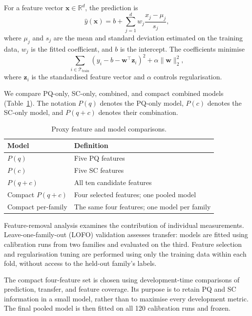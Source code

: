 \documentclass[a4paper,fleqn]{cas-dc}
\begin{document}
{For a feature vector $\mathbf{x}\in\mathbb{R}^{d}$, the prediction is
\begin{equation}
\hat{y}(\mathbf{x})
=
b+\sum_{j=1}^{d}
w_j\frac{x_j-\mu_j}{s_j},
\label{eq:ridge-proxy}
\end{equation}
where $\mu_j$ and $s_j$ are the mean and standard deviation estimated on the training data, $w_j$ is the fitted coefficient, and $b$ is the intercept. The coefficients minimise
\begin{equation}
\sum_{i\in\mathcal{T}_{\mathrm{train}}}
\left(y_i-b-\mathbf{w}^{\top}\mathbf{z}_i\right)^2
+\alpha\|\mathbf{w}\|_2^2,
\label{eq:ridge-objective}
\end{equation}
where $\mathbf{z}_i$ is the standardised feature vector and $\alpha$ controls regularisation.

We compare PQ-only, SC-only, combined, and compact combined models (Table~\ref{tab:proxy-ablation}). The notation $P(q)$ denotes the PQ-only model, $P(c)$ denotes the SC-only model, and $P(q{+}c)$ denotes their combination.

\begin{table}[ht]
\caption{Proxy feature and model comparisons.}
\label{tab:proxy-ablation}
\centering
\begin{tabular}{p{} p{}}
\toprule
Model & Definition \\
\midrule
$P(q)$ & Five PQ features \\
$P(c)$ & Five SC features \\
$P(q{+}c)$ & All ten candidate features \\
Compact $P(q{+}c)$ & Four selected features; one pooled model \\
Compact per-family & The same four features; one model per family \\
\bottomrule
\end{tabular}
\end{table}

Feature-removal analysis examines the contribution of individual measurements. Leave-one-family-out (LOFO) validation assesses transfer: models are fitted using calibration runs from two families and evaluated on the third. Feature selection and regularisation tuning are performed using only the training data within each fold, without access to the held-out family's labels.

The compact four-feature set is chosen using development-time comparisons of prediction, transfer, and feature coverage. Its purpose is to retain PQ and SC information in a small model, rather than to maximise every development metric. The final pooled model is then fitted on all 120 calibration runs and frozen.

}
\end{document}
